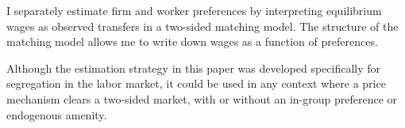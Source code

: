 \documentclass[11pt]{article}
\begin{document}
I separately estimate firm and worker preferences by interpreting equilibrium wages as observed transfers in a two-sided matching model. The structure of the matching model allows me to write down wages as a function of preferences.


Although the estimation strategy in this paper was developed specifically for segregation in the labor market, it could be used in any context where a price mechanism clears a two-sided market, with or without an in-group preference or endogenous amenity. 





\end{document}

